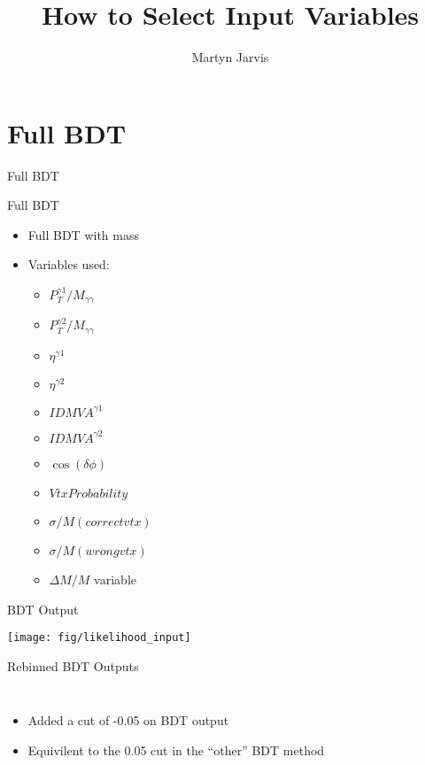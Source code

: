 \documentclass[t, 8pt]{beamer}
\author{Martyn Jarvis}
\title[Input Variables]{How to Select Input Variables}
\begin{document}


\section{Full BDT}
\begin{frame}{Full BDT}
\end{frame}

\begin{frame}{Full BDT}
  \begin{itemize}  
  \item Full BDT with mass
  \item Variables used:
  \begin{itemize}  
    \item $P_T^{\gamma 1} / M_{\gamma \gamma}$
    \item $P_T^{\gamma 2} / M_{\gamma \gamma}$
    \item $\eta^{\gamma 1}$
    \item $\eta^{\gamma 2}$
    \item $ID MVA^{\gamma 1}$
    \item $ID MVA^{\gamma 2}$
    \item $\cos( \delta \phi )$
    \item $Vtx Probability$
    \item $\sigma/M (correct vtx)$
    \item $\sigma/M (wrong vtx)$
    \item \alert{$\Delta M/M$ variable}
  \end{itemize}
  \end{itemize}
\end{frame}

\begin{frame}{BDT Output}
\begin{center}
    \texttt{[image: fig/likelihood\_input]}
\end{center}
\end{frame}


\begin{frame}{Rebinned BDT Outputs}
  \begin{columns}[c]
  \begin{itemize}
    \item Added a cut of -0.05 on BDT output
    \item Equivilent to the 0.05 cut in the ``other'' BDT method
  \end{itemize}
  \end{columns}
\end{frame}
\end{document}
